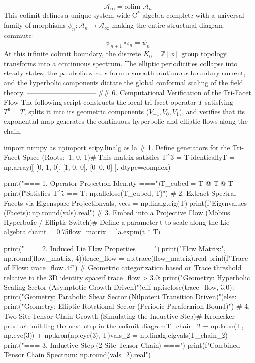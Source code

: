 $$\mathcal{A}_\infty = \text{colim } \mathcal{A}_n$$ 
This colimit defines a unique system-wide $\text{C}^*$-algebra complete with a universal family of morphisms $\psi_n: \mathcal{A}_n \to \mathcal{A}_\infty$ making the entire structural diagram commute:
$$\psi_{n+1} \circ \iota_n = \psi_n$$ 
At this infinite colimit boundary, the discrete $K_0 = \mathbb{Z}[\phi]$ group topology transforms into a continuous spectrum. The elliptic periodicities collapse into steady states, the parabolic shears form a smooth continuous boundary current, and the hyperbolic components dictate the global conformal scaling of the field theory.
------------------------------
## 6. Computational Verification of the Tri-Facet Flow
The following script constructs the local tri-facet operator $T$ satisfying $T^3 = T$, splits it into its geometric components ($V_{-1}, V_0, V_1$), and verifies that its exponential map generates the continuous hyperbolic and elliptic flows along the chain.

import numpy as npimport scipy.linalg as la
# 1. Define generators for the Tri-Facet Space (Roots: -1, 0, 1)# This matrix satisfies T^3 = T identicallyT = np.array([
    [0, 1, 0],
    [1, 0, 0],
    [0, 0, 0]
], dtype=complex)

print("=== 1. Operator Projection Identity ===")T_cubed = T @ T @ T
print(f"Satisfies T^3 == T: {np.allclose(T_cubed, T)}")
# 2. Extract Spectral Facets via Eigenspace Projectionvals, vecs = np.linalg.eig(T)
print(f"Eigenvalues (Facets): {np.round(vals).real}")
# 3. Embed into a Projective Flow (Möbius Hyperbolic / Elliptic Switch)# Define a parameter t to scale along the Lie algebra chaint = 0.75flow_matrix = la.expm(t * T)

print("\n=== 2. Induced Lie Flow Properties ===")
print("Flow Matrix:\n", np.round(flow_matrix, 4))trace_flow = np.trace(flow_matrix).real
print(f"Trace of Flow: {trace_flow:.4f}")
# Geometric categorization based on Trace threshold relative to the 3D identity spaceif trace_flow > 3.0:
    print("Geometry: Hyperbolic Scaling Sector (Asymptotic Growth Driven)")elif np.isclose(trace_flow, 3.0):
    print("Geometry: Parabolic Shear Sector (Nilpotent Transition Driven)")else:
    print("Geometry: Elliptic Rotational Sector (Periodic Parafermion Bound)")
# 4. Two-Site Tensor Chain Growth (Simulating the Inductive Step)# Kronecker product building the next step in the colimit diagramT_chain_2 = np.kron(T, np.eye(3)) + np.kron(np.eye(3), T)vals_2 = np.linalg.eigvals(T_chain_2)
print("\n=== 3. Inductive Step (2-Site Tensor Chain) ===")
print(f"Combined Tensor Chain Spectrum: {np.round(vals_2).real}")

